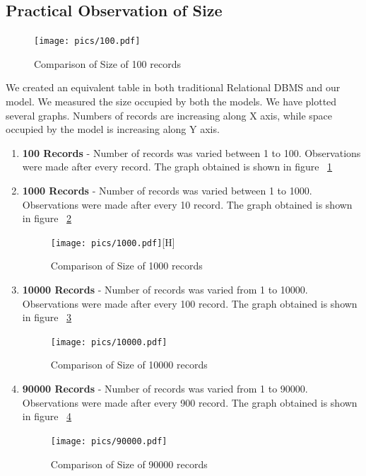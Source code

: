 \documentclass[12pt, oneside]{book}
\begin{document}
\subsection{Practical Observation of Size}
\begin{figure}[ht]
  \centering
   \texttt{[image: pics/100.pdf]}
   \caption{Comparison of Size of 100 records}
   \label{fig:100result}
\end{figure}
We created an equivalent table in both traditional Relational DBMS and our model. We measured the size occupied by both the models. We have plotted several graphs. Numbers of records are increasing along X axis, while space occupied by the model is increasing along Y axis.
\begin{enumerate}
 \item \textbf{100 Records} - Number of records was varied between 1 to 100. Observations were made after every record. The graph obtained is shown in figure ~\ref{fig:100result}
  \item \textbf{1000 Records} - Number of records was varied between 1 to 1000. Observations were made after every 10 record. The graph obtained is shown in figure ~\ref{fig:1000result}
 \begin{figure}[H]
  \begin{center}
   \texttt{[image: pics/1000.pdf]}[H]
   \caption{Comparison of Size of 1000 records}
   \label{fig:1000result}
  \end{center}
 \end{figure}
  \item \textbf{10000 Records} - Number of records was varied from 1 to 10000. Observations were made after every 100 record. The graph obtained is shown in figure ~\ref{fig:10000result}
 \begin{figure}[H]
  \begin{center}
   \texttt{[image: pics/10000.pdf]}
   \caption{Comparison of Size of 10000 records}
   \label{fig:10000result}
  \end{center}
 \end{figure}
 \item \textbf{90000 Records} - Number of records was varied from 1 to 90000. Observations were made after every 900 record. The graph obtained is shown in figure ~\ref{fig:90000result}
 \begin{figure}[ht]
  \begin{center}
   \texttt{[image: pics/90000.pdf]}
   \caption{Comparison of Size of 90000 records}
   \label{fig:90000result}
  \end{center}
 \end{figure}
\end{enumerate}
\end{document}
